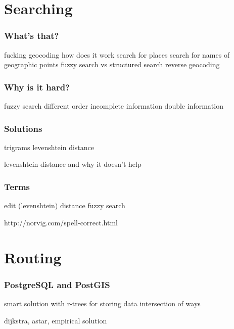 \documentclass{beamer}
\begin{document}
\section{Searching}

\begin{frame}
  \frametitle{What's that?}
  fucking geocoding how does it work
  search for places
  search for names of geographic points
  fuzzy search vs structured search
  reverse geocoding
\end{frame}

\begin{frame}
  \frametitle{Why is it hard?}
  fuzzy search
  different order
  incomplete information
  double information
\end{frame}

\begin{frame}
  \frametitle{Solutions}
  trigrams
  levenshtein distance
\end{frame}

\begin{frame}
  levenshtein distance and why it doesn't help
\end{frame}

\begin{frame}
  \frametitle{Terms}
  edit (levenshtein) distance
  fuzzy search
\end{frame}



http://norvig.com/spell-correct.html







\section{Routing}

\begin{frame}
  \frametitle{PostgreSQL and PostGIS}

\end{frame}

\begin{frame}
  smart solution with r-trees for storing data
  intersection of ways
\end{frame}

\begin{frame}
  dijkstra, astar, empirical solution
\end{frame}
\end{document}
